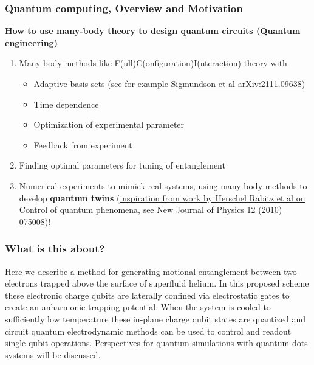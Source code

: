 \documentclass{beamer}
\begin{document}
\begin{frame}
\frametitle{Quantum computing, Overview and Motivation}

\textbf{How to use many-body theory to design quantum circuits (Quantum engineering)}
\begin{enumerate}
\item Many-body methods like F(ull)C(onfiguration)I(nteraction) theory  with
\begin{itemize}

  \item Adaptive basis sets (see for example \href{{https://arxiv.org/abs/2111.09638}}{Sigmundson et al arXiv:2111.09638})

  \item Time dependence

  \item Optimization of experimental parameter 

  \item Feedback from experiment

\end{itemize}

\noindent
\item Finding optimal parameters for tuning of entanglement

\item Numerical experiments to mimick real systems, using many-body methods to develop \textbf{quantum twins} (\href{{https://iopscience.iop.org/article/10.1088/1367-2630/12/7/075008}}{inspiration from  work by Herschel Rabitz et al on Control of quantum phenomena, see New Journal of Physics 12 (2010) 075008})!
\end{enumerate}

\noindent
\end{frame}

\begin{frame}
\frametitle{What is this about?}

Here we describe a method for generating motional entanglement between
two electrons trapped above the surface of superfluid helium. In this
proposed scheme these electronic charge qubits are laterally confined
via electrostatic gates to create an anharmonic trapping
potential. When the system is cooled to sufficiently low temperature
these in-plane charge qubit states are quantized and circuit quantum
electrodynamic methods can be used to control and readout single qubit
operations. Perspectives for quantum simulations with quantum dots
systems will be discussed.
\end{frame}
\end{document}
